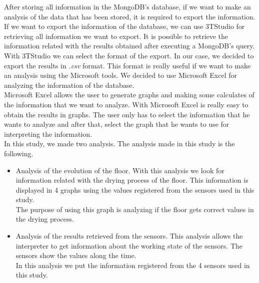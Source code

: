 After storing all information in the MongoDB's database, if we want to make an analysis of the data that has been stored, it is required to export the information.\\

If we want to export the information of the database, we can use 3TStudio for retrieving all information we want to export. It is possible to retrieve the information related with the results obtained after executing a MongoDB's query.\\

With 3TStudio we can select the format of the export. In our case, we decided to export the results in \textit{.csv} format. This format is really useful if we want to make an analysis using the Microsoft tools. We decided to use Microsoft Excel for analyzing the information of the database.\\

Microsoft Excel allows the user to generate graphs and making some calculates of the information that we want to analyze. With Microsoft Excel is really easy to obtain the results in graphs. The user only has to select the information that he wants to analyze and after that, select the graph that he wants to use for interpreting the information.\\

In this study, we made two analysis. The analysis made in this study is the following.

\begin{itemize}

\item Analysis of the evolution of the floor. With this analysis we look for information related with the drying process of the floor. This information is displayed in 4 graphs using the values registered from the sensors used in this study.\\

The purpose of using this graph is analyzing if the floor gets correct values in the drying process.

\item Analysis of the results retrieved from the sensors. This analysis allows the interpreter to get information about the working state of the sensors. The sensors show the values along the time.\\

In this analysis we put the information registered from the 4 sensors used in this study.

\end{itemize}

